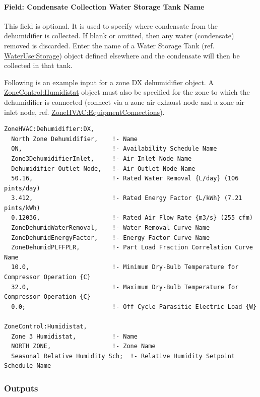 \paragraph{Field: Condensate Collection Water Storage Tank Name}\label{field-condensate-collection-water-storage-tank-name-000}

This field is optional. It is used to specify where condensate from the dehumidifier is collected. If blank or omitted, then any water (condensate) removed is discarded. Enter the name of a Water Storage Tank (ref. \hyperref[waterusestorage]{WaterUse:Storage}) object defined elsewhere and the condensate will then be collected in that tank.

Following is an example input for a zone DX dehumidifier object. A \hyperref[zonecontrolhumidistat]{ZoneControl:Humidistat} object must also be specified for the zone to which the dehumidifier is connected (connect via a zone air exhaust node and a zone air inlet node, ref. \hyperref[zonehvacequipmentconnections]{ZoneHVAC:EquipmentConnections}).

\begin{lstlisting}
ZoneHVAC:Dehumidifier:DX,
  North Zone Dehumidifier,    !- Name
  ON,                         !- Availability Schedule Name
  Zone3DehumidifierInlet,     !- Air Inlet Node Name
  Dehumidifier Outlet Node,   !- Air Outlet Node Name
  50.16,                      !- Rated Water Removal {L/day} (106 pints/day)
  3.412,                      !- Rated Energy Factor {L/kWh} (7.21 pints/kWh)
  0.12036,                    !- Rated Air Flow Rate {m3/s} (255 cfm)
  ZoneDehumidWaterRemoval,    !- Water Removal Curve Name
  ZoneDehumidEnergyFactor,    !- Energy Factor Curve Name
  ZoneDehumidPLFFPLR,         !- Part Load Fraction Correlation Curve Name
  10.0,                       !- Minimum Dry-Bulb Temperature for Compressor Operation {C}
  32.0,                       !- Maximum Dry-Bulb Temperature for Compressor Operation {C}
  0.0;                        !- Off Cycle Parasitic Electric Load {W}

ZoneControl:Humidistat,
  Zone 3 Humidistat,          !- Name
  NORTH ZONE,                 !- Zone Name
  Seasonal Relative Humidity Sch;  !- Relative Humidity Setpoint Schedule Name
\end{lstlisting}

\subsubsection{Outputs}\label{outputs-10-008}

